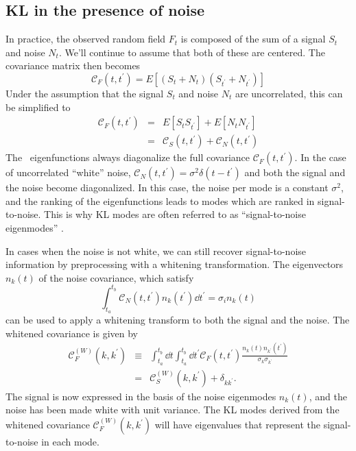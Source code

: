 \subsection{KL in the presence of noise}
\label{sec:whitening_chp2}
In practice, the observed random field $F_t$ is composed of the sum of
a signal $S_t$ and noise $N_t$.  We'll continue to assume that both of these
are centered.  The covariance matrix then becomes
\begin{equation}
  \mathcal{C}_F(t, t^\prime) = E[(S_t + N_t)(S_{t^\prime}+N_{t^\prime})]
\end{equation}
Under the assumption that the signal $S_t$ and noise $N_t$ are uncorrelated,
this can be simplified to
\begin{eqnarray}
  \mathcal{C}_F(t, t^\prime) &=& E[S_t S_{t^\prime}]
  + E[N_t N_{t^\prime}] \nonumber\\
  &=& \mathcal{C}_S(t, t^\prime) + \mathcal{C}_N(t, t^\prime)
\end{eqnarray}
The \KL\ eigenfunctions always diagonalize the full covariance
$\mathcal{C}_F(t, t^\prime)$.
In the case of uncorrelated ``white'' noise,
$\mathcal{C}_N(t, t^\prime) = \sigma^2 \delta(t - t^\prime)$
and both the signal and the noise become diagonalized.  In this case,
the noise per mode is a constant $\sigma^2$, and the ranking of the
eigenfunctions leads to modes which are ranked in signal-to-noise.
This is why KL modes are often referred to as ``signal-to-noise
eigenmodes'' \citep{Vogeley96}.

In cases when the noise is not white, we can still recover signal-to-noise
information by preprocessing with a whitening transformation.  The eigenvectors
$n_k(t)$ of the noise covariance, which satisfy
\begin{equation}
  \int_{t_a}^{t_b} \mathcal{C}_N(t, t^\prime) n_k(t^\prime) \dd t^\prime 
  = \sigma_i n_k(t)
\end{equation}
can be used to apply a whitening transform to both the signal and the
noise.  The whitened covariance is given by
\begin{eqnarray}
  \mathcal{C}_F^{(W)}(k, k^\prime) &\equiv& \int_{t_a}^{t_b}\dd t\int_{t_a}^{t_b}\dd t^\prime
  \mathcal{C}_F(t, t^\prime)
  \frac{n_k(t) n_{k^\prime}(t^\prime)}{\sigma_k\sigma_{k^\prime}}\nonumber\\
  &=& \mathcal{C}_S^{(W)}(k, k^\prime) + \delta_{kk^\prime}.
\end{eqnarray}
The signal is now expressed in the basis of the noise eigenmodes $n_k(t)$,
and the noise has been made white with unit variance.  The KL modes derived
from the whitened covariance $\mathcal{C}_F^{(W)}(k, k^\prime)$ will have
eigenvalues that represent the signal-to-noise in each mode.

